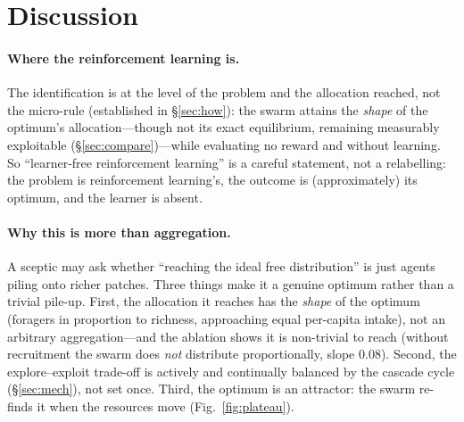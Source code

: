 \documentclass{article}
\begin{document}
\section{Discussion}
\paragraph{Where the reinforcement learning is.} The identification is at the level of the problem and the
allocation reached, not the micro-rule (established in \S\ref{sec:how}): the swarm attains the \emph{shape} of
the optimum's allocation---though not its exact equilibrium, remaining measurably exploitable
(\S\ref{sec:compare})---while evaluating no reward and without learning. So ``learner-free reinforcement
learning'' is a careful statement, not a relabelling: the problem is reinforcement learning's, the outcome is
(approximately) its optimum, and the learner is absent.

\paragraph{Why this is more than aggregation.} A sceptic may ask whether ``reaching the ideal free
distribution'' is just agents piling onto richer patches. Three things make it a genuine optimum rather than a
trivial pile-up. First, the allocation it reaches has the \emph{shape} of the optimum (foragers in proportion
to richness, approaching equal per-capita intake), not an arbitrary aggregation---and the ablation shows it is
non-trivial to reach (without recruitment the swarm does \emph{not} distribute proportionally, slope $0.08$). Second, the explore--exploit trade-off is actively and
continually balanced by the cascade cycle (\S\ref{sec:mech}), not set once. Third, the optimum is an attractor:
the swarm re-finds it when the resources move (Fig.~\ref{fig:plateau}).
\end{document}
